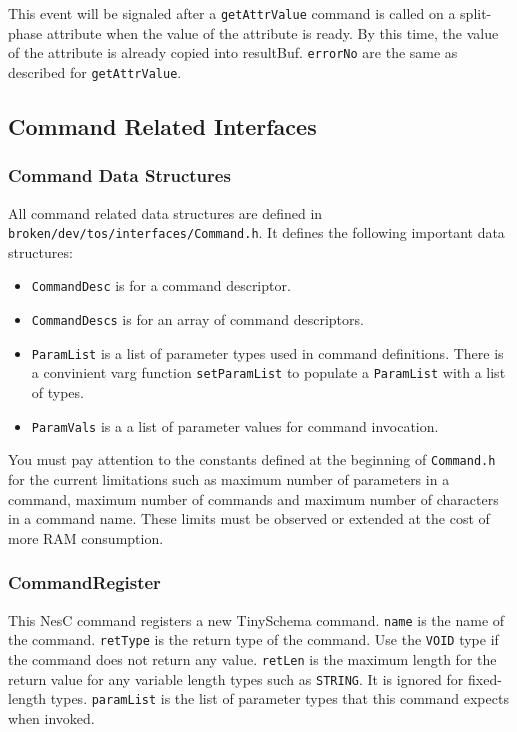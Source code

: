 \documentclass[11pt]{article}
\newcommand{\docroot}{broken/dev}
\begin{document}
This event will be signaled after a {\tt getAttrValue} command is called on
a split-phase attribute when the value of the attribute is ready.
By this time, the value of the attribute is already copied into resultBuf.
{\tt errorNo} are the same as described for {\tt getAttrValue}.

\subsection{Command Related Interfaces}
\subsubsection{Command Data Structures}

All command related data structures are defined in
{\tt \docroot/tos/interfaces/Command.h}.
It defines the following important data structures:
\begin{itemize}
\item {\tt CommandDesc} is for a command descriptor.
\item {\tt CommandDescs} is for an array of command descriptors.
\item {\tt ParamList} is a list of parameter types used in command definitions.
There is a convinient varg function {\tt setParamList} to 
populate a {\tt ParamList} with a list of types.
\item {\tt ParamVals} is a a list of parameter values for command invocation.
\end{itemize}

You must pay attention to the constants defined at the beginning
of {\tt Command.h} for the current limitations such as maximum number of
parameters in a command, maximum number of commands and maximum number of
characters in a command name.  These limits must be observed or extended
at the cost of more RAM consumption.

\subsubsection{CommandRegister}


This NesC command registers a new TinySchema command.  {\tt name} is the
name of the command.  {\tt retType} is the return type of the command.
Use the {\tt VOID} type if the command does not return any value.
{\tt retLen} is the maximum length for the return value
for any variable length types such as {\tt STRING}.
It is ignored for fixed-length types.
{\tt paramList} is the list of parameter types that this
command expects when invoked.
\end{document}
